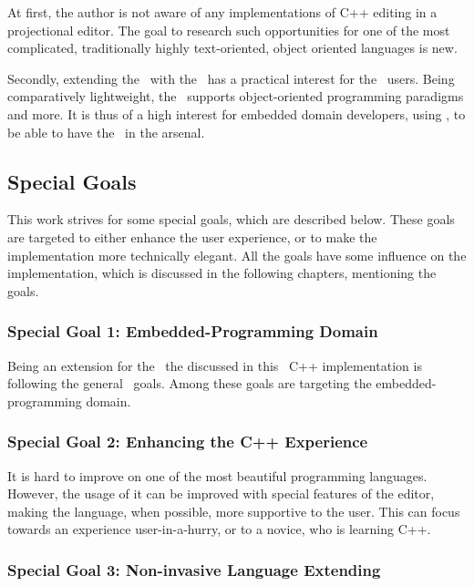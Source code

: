 At first, the author is not aware of any implementations of C++ editing in a projectional editor. The goal to research
such opportunities for one of the most complicated, traditionally highly text-oriented, object oriented languages is
new.

Secondly, extending the \mbdrp\ with the \cpppl\ has a practical interest for the \mbdrp\ users. Being comparatively lightweight,
the \cpppl\ supports object-oriented programming paradigms and more. It is thus of a high interest for embedded domain developers, using \mbdr,
to be able to have the \cpppl\ in the arsenal.

\subsection{Special Goals}

This work strives for some special goals, which are described below. These goals are targeted to either enhance
the user experience, or to make the implementation more technically elegant. All the goals have some influence on the implementation,
which is discussed in the following chapters, mentioning the goals.

\subsubsection{Special Goal 1: Embedded-Programming Domain}
\label{g1}

Being an extension for the \mbp\ the discussed in this \MT\ C++ implementation is following the general \mb\ goals. Among these goals are targeting
the embedded-programming domain.

\subsubsection{Special Goal 2: Enhancing the C++ Experience}
\label{g2}

It is hard to improve on one of the most beautiful programming languages. However, the usage of it can be improved
with special features of the editor, making the language, when possible, more supportive to the user. This can focus
towards an experience user-in-a-hurry, or to a novice, who is learning C++.

\subsubsection{Special Goal 3: Non-invasive Language Extending}
\label{g3}

